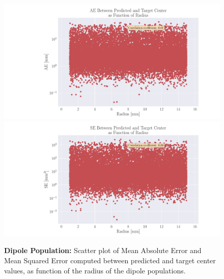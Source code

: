 \documentclass[a4paper, UKenglish, 11pt]{uiomaster}
\begin{document}
\begin{figure}
  \includegraphics[width=12cm]{figures/mae_area.pdf}
  \includegraphics[width=12cm]{figures/mse_area.pdf}
  \caption{\textbf{Dipole Population:}
  Scatter plot of Mean Absolute Error and Mean Squared Error computed between predicted and target center values, as function of the radius of the dipole populations.}
  \label{fig:area_errors}
\end{figure}
\end{document}
